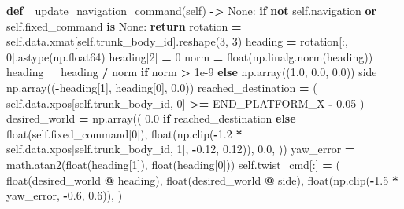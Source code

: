 \documentclass[
  american,
  11pt,
  letterpaper,
]{article}
\newenvironment{Shaded}{\begin{snugshade}}{\end{snugshade}}
\newcommand{\BuiltInTok}[1]{#1}
\newcommand{\ControlFlowTok}[1]{\textcolor[rgb]{0.13,0.29,0.53}{\textbf{#1}}}
\newcommand{\DecValTok}[1]{\textcolor[rgb]{0.00,0.00,0.81}{#1}}
\newcommand{\FloatTok}[1]{\textcolor[rgb]{0.00,0.00,0.81}{#1}}
\newcommand{\KeywordTok}[1]{\textcolor[rgb]{0.13,0.29,0.53}{\textbf{#1}}}
\newcommand{\NormalTok}[1]{#1}
\newcommand{\OperatorTok}[1]{\textcolor[rgb]{0.81,0.36,0.00}{\textbf{#1}}}
\newcommand{\VariableTok}[1]{\textcolor[rgb]{0.00,0.00,0.00}{#1}}
\renewenvironment{Shaded}{\par\smallskip}{\par\smallskip}
\begin{document}
\begin{Shaded}
\begin{Highlighting}[]
    \KeywordTok{def}\NormalTok{ \_update\_navigation\_command(}\VariableTok{self}\NormalTok{) }\OperatorTok{{-}\textgreater{}} \VariableTok{None}\NormalTok{:}
        \ControlFlowTok{if} \KeywordTok{not} \VariableTok{self}\NormalTok{.navigation }\KeywordTok{or} \VariableTok{self}\NormalTok{.fixed\_command }\KeywordTok{is} \VariableTok{None}\NormalTok{:}
            \ControlFlowTok{return}
\NormalTok{        rotation }\OperatorTok{=} \VariableTok{self}\NormalTok{.data.xmat[}\VariableTok{self}\NormalTok{.trunk\_body\_id].reshape(}\DecValTok{3}\NormalTok{, }\DecValTok{3}\NormalTok{)}
\NormalTok{        heading }\OperatorTok{=}\NormalTok{ rotation[:, }\DecValTok{0}\NormalTok{].astype(np.float64)}
\NormalTok{        heading[}\DecValTok{2}\NormalTok{] }\OperatorTok{=} \DecValTok{0}
\NormalTok{        norm }\OperatorTok{=} \BuiltInTok{float}\NormalTok{(np.linalg.norm(heading))}
\NormalTok{        heading }\OperatorTok{=}\NormalTok{ heading }\OperatorTok{/}\NormalTok{ norm }\ControlFlowTok{if}\NormalTok{ norm }\OperatorTok{\textgreater{}} \FloatTok{1e{-}9} \ControlFlowTok{else}\NormalTok{ np.array((}\FloatTok{1.0}\NormalTok{, }\FloatTok{0.0}\NormalTok{, }\FloatTok{0.0}\NormalTok{))}
\NormalTok{        side }\OperatorTok{=}\NormalTok{ np.array((}\OperatorTok{{-}}\NormalTok{heading[}\DecValTok{1}\NormalTok{], heading[}\DecValTok{0}\NormalTok{], }\FloatTok{0.0}\NormalTok{))}
\NormalTok{        reached\_destination }\OperatorTok{=}\NormalTok{ (}
            \VariableTok{self}\NormalTok{.data.xpos[}\VariableTok{self}\NormalTok{.trunk\_body\_id, }\DecValTok{0}\NormalTok{] }\OperatorTok{\textgreater{}=}\NormalTok{ END\_PLATFORM\_X }\OperatorTok{{-}} \FloatTok{0.05}
\NormalTok{        )}
\NormalTok{        desired\_world }\OperatorTok{=}\NormalTok{ np.array((}
            \FloatTok{0.0} \ControlFlowTok{if}\NormalTok{ reached\_destination }\ControlFlowTok{else} \BuiltInTok{float}\NormalTok{(}\VariableTok{self}\NormalTok{.fixed\_command[}\DecValTok{0}\NormalTok{]),}
            \BuiltInTok{float}\NormalTok{(np.clip(}\OperatorTok{{-}}\FloatTok{1.2} \OperatorTok{*} \VariableTok{self}\NormalTok{.data.xpos[}\VariableTok{self}\NormalTok{.trunk\_body\_id, }\DecValTok{1}\NormalTok{], }\OperatorTok{{-}}\FloatTok{0.12}\NormalTok{, }\FloatTok{0.12}\NormalTok{)),}
            \FloatTok{0.0}\NormalTok{,}
\NormalTok{        ))}
\NormalTok{        yaw\_error }\OperatorTok{=}\NormalTok{ math.atan2(}\BuiltInTok{float}\NormalTok{(heading[}\DecValTok{1}\NormalTok{]), }\BuiltInTok{float}\NormalTok{(heading[}\DecValTok{0}\NormalTok{]))}
        \VariableTok{self}\NormalTok{.twist\_cmd[:] }\OperatorTok{=}\NormalTok{ (}
            \BuiltInTok{float}\NormalTok{(desired\_world }\OperatorTok{@}\NormalTok{ heading),}
            \BuiltInTok{float}\NormalTok{(desired\_world }\OperatorTok{@}\NormalTok{ side),}
            \BuiltInTok{float}\NormalTok{(np.clip(}\OperatorTok{{-}}\FloatTok{1.5} \OperatorTok{*}\NormalTok{ yaw\_error, }\OperatorTok{{-}}\FloatTok{0.6}\NormalTok{, }\FloatTok{0.6}\NormalTok{)),}
\NormalTok{        )}


\end{Highlighting}
\end{Shaded}
\end{document}
